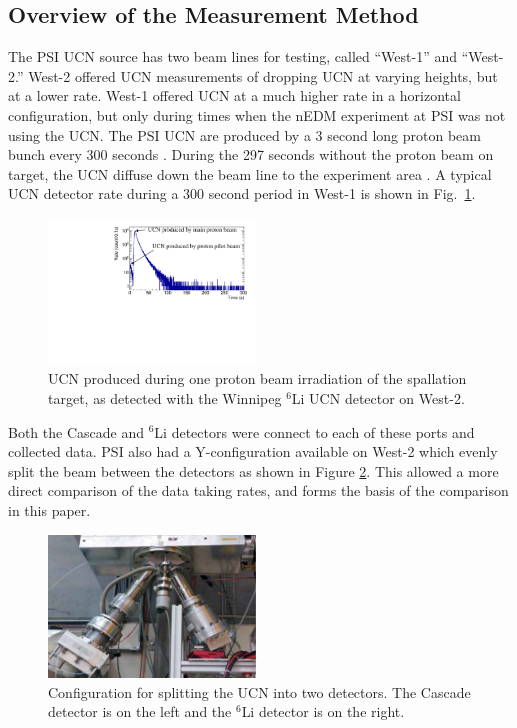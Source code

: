 \documentclass[review]{elsarticle}
\begin{document}
\subsection{Overview of the Measurement Method}


The PSI UCN source has two beam lines for testing, called ``West-1''
and ``West-2.''  West-2 offered UCN measurements of dropping UCN at
varying heights, but at a lower rate.  West-1 offered UCN at a much
higher rate in a horizontal configuration, but only during times when
the nEDM experiment at PSI was not using the UCN.  The PSI UCN are
produced by a 3 second long proton beam bunch every 300 seconds
\cite{ucnBeam}.  During the 297 seconds without the proton beam on
target, the UCN diffuse down the beam line to the experiment area
\cite{ucnProduction}.  A typical UCN detector rate during a 300 second
period in West-1 is shown in Fig.~\ref{fig:protonCycle}.

\begin{figure}[htpb] 
\begin{center} 
\includegraphics[width=0.49\textwidth]{figures/run50oneprotonbunch.pdf} 
\caption{ UCN produced during one proton beam irradiation of the
  spallation target, as detected with the Winnipeg $^6$Li UCN detector
  on West-2. }
\label{fig:protonCycle} 
\end{center} 
\end{figure}

Both the Cascade and $^6$Li detectors were connect to each of these
ports and collected data.  PSI also had a Y-configuration available on
West-2 which evenly split the beam between the detectors as shown in
Figure \ref{fig:yConfig}.  This allowed a more direct comparison of
the data taking rates, and forms the basis of the comparison in this
paper.

\begin{figure}[!htpb] 
\centering \includegraphics[width=0.49\textwidth]{figures/yConfig.pdf}
\caption{Configuration for splitting the UCN into two detectors.  The
  Cascade detector is on the left and the $^6$Li detector is on the
  right.}
\label{fig:yConfig}
\end{figure}
\end{document}
